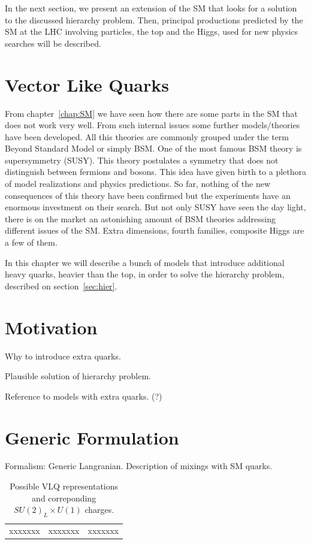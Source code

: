 In the next section, we present an extension of the SM that looks for a solution to the discussed hierarchy problem. Then, principal productions predicted by the SM at the LHC involving particles, the top and the Higgs, used for new physics searches will be described. 

\section{Vector Like Quarks}

\label{chap:VLQ}

From chapter~\ref{chap:SM} we have seen how there are some parts in the SM that does not work very well. From such internal issues some further models/theories have been developed. All this theories are commonly grouped under the term Beyond Standard Model or simply BSM. One of the most famous BSM theory is supersymmetry (SUSY). This theory postulates a symmetry that does not distinguish between fermions and bosons. This idea have given birth to a plethora of model realizations and physics predictions. So far, nothing of the new consequences of this theory have been confirmed but the experiments have an enormous investment on their search. But not only SUSY have seen the day light, there is on the market an astonishing amount of BSM theories addressing different issues of the SM. Extra dimensions, fourth families, composite Higgs are a few of them.

In this chapter we will describe a bunch of models that introduce additional heavy quarks, heavier than the top, in order to solve the hierarchy problem, described on section~\ref{sec:hier}. 

\section{Motivation}
\label{sec:motiv}

Why to introduce extra quarks.

Plausible solution of hierarchy problem.

Reference to models with extra quarks. (?)

\section{Generic Formulation}
\label{sec:form}

Formalism: Generic Langranian. Description of mixings with SM quarks.

\begin{table}[htbH]
\label{tab:VLQRepre}
\begin{center}
\begin{tabular}{|c|c|c|}
xxxxxxx & xxxxxxx & xxxxxxx
\end{tabular}
\caption{Possible VLQ representations and correponding $SU(2)_{L}\times U(1)$ charges.}
\end{center}
\end{table}

